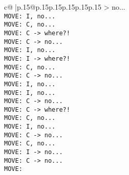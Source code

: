 \documentclass{article}
\begin{document}
{\begin{supertabular}{c@{$\;$}|p{.15\linewidth}@{}p{.15\linewidth}p{.15\linewidth}p{.15\linewidth}p{.15\linewidth}p{.15\linewidth}}
{{{> no...\\ \tt  MOVE: I, no...\\ \tt  MOVE: C, no...\\ \tt  MOVE: C -> where?!\\ \tt  MOVE: C -> no...\\ \tt  MOVE: I, no...\\ \tt  MOVE: I -> where?!\\ \tt  MOVE: C, no...\\ \tt  MOVE: C -> no...\\ \tt  MOVE: I, no...\\ \tt  MOVE: I, no...\\ \tt  MOVE: C -> no...\\ \tt  MOVE: C -> where?!\\ \tt  MOVE: C, no...\\ \tt  MOVE: I, no...\\ \tt  MOVE: C -> no...\\ \tt  MOVE: C, no...\\ \tt  MOVE: I -> no...\\ \tt  MOVE: C -> no...\\ \tt  MOVE: }}}
\end{supertabular}}
\end{document}
